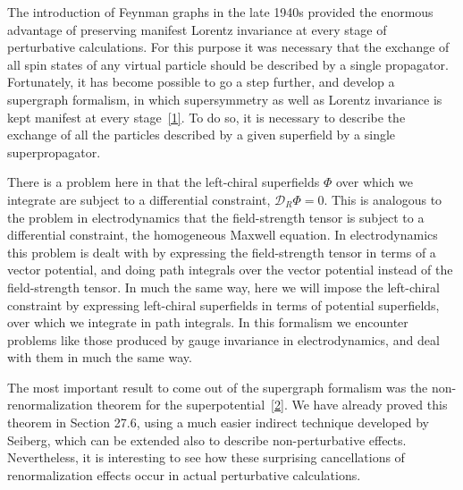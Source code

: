 
The introduction of Feynman graphs in the late 1940s provided the enormous
advantage of preserving manifest Lorentz invariance at every stage of
perturbative calculations. For this purpose it was necessary that the exchange
of all spin states of any virtual particle should be described by a single
propagator. Fortunately, it has become possible to go a step further, and
develop a supergraph formalism, in which supersymmetry as well as Lorentz
invariance is kept manifest at every stage~\hyperref[ch30-ref-1]{[1]}. To do
so, it is necessary to describe the exchange of all the particles described by
a given superfield by a single superpropagator.

There is a problem here in that the left-chiral superfields \(\Phi\) over which
we integrate are subject to a differential constraint,
\(\mathcal{D}_R\Phi=0\). This is analogous to the problem in electrodynamics
that the field-strength tensor is subject to a differential constraint, the
homogeneous Maxwell equation. In electrodynamics this problem is dealt with by
expressing the field-strength tensor in terms of a vector potential, and doing
path integrals over the vector potential instead of the field-strength tensor.
In much the same way, here we will impose the left-chiral constraint by
expressing left-chiral superfields in terms of potential superfields, over
which we integrate in path integrals. In this formalism we encounter problems
like those produced by gauge invariance in electrodynamics, and deal with them
in much the same way.

The most important result to come out of the supergraph formalism was the
non-renormalization theorem for the
superpotential~\hyperref[ch30-ref-2]{[2]}. We have already proved this theorem
in Section 27.6, using a much easier indirect technique developed by Seiberg,
which can be extended also to describe non-perturbative effects. Nevertheless,
it is interesting to see how these surprising cancellations of renormalization
effects occur in actual perturbative calculations.
